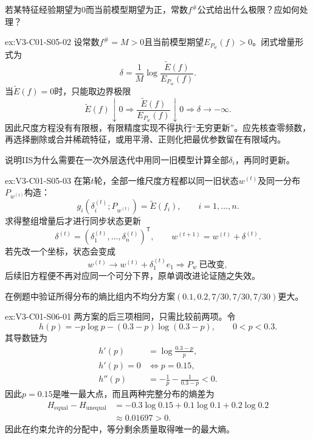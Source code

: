 \begin{SLChapterExercisePairSection}
\begin{exercise}\label{ex:V3-C01-S05-02}
若某特征经验期望为0而当前模型期望为正，常数$f^\#$公式给出什么极限？应如何处理？
\end{exercise}
\ifSLFullEdition
{}\label{sol:V3-C01-S05-02}
\begin{chapterexercisesolution}{ex:V3-C01-S05-02}
设常数$f^\#=M>0$且当前模型期望$E_{P_w}(f)>0$。闭式增量形式为
\[
\delta=\frac1M\log\frac{\widetilde E(f)}{E_{P_w}(f)}.
\]
当$\widetilde E(f)=0$时，只能取边界极限
\[
\widetilde E(f)\downarrow0
\Longrightarrow
\frac{\widetilde E(f)}{E_{P_w}(f)}\downarrow0
\Longrightarrow
\delta\to-\infty.
\]
因此尺度方程没有有限根，有限精度实现不得执行“无穷更新”。应先核查零频数，再选择删除或合并稀疏特征，或用平滑、正则化把最优参数留在有限域内。
\end{chapterexercisesolution}
\fi

\begin{exercise}\label{ex:V3-C01-S05-03}
说明IIS为什么需要在一次外层迭代中用同一旧模型计算全部$\delta_i$，再同时更新。
\end{exercise}
\ifSLFullEdition
{}\label{sol:V3-C01-S05-03}
\begin{chapterexercisesolution}{ex:V3-C01-S05-03}
在第$t$轮，全部一维尺度方程都以同一旧状态$w^{(t)}$及同一分布$P_{w^{(t)}}$构造：
\[
g_i\!\left(\delta_i^{(t)};P_{w^{(t)}}\right)
=\widetilde E(f_i),
\qquad i=1,\ldots,n.
\]
求得整组增量后才进行同步状态更新
\[
\delta^{(t)}=(\delta_1^{(t)},\ldots,\delta_n^{(t)})^{\mathsf T},
\qquad
w^{(t+1)}=w^{(t)}+\delta^{(t)}.
\]
若先改一个坐标，状态会变成
\[
w^{(t)}\to w^{(t)}+\delta_1^{(t)}e_1
\Longrightarrow
P_w\ \text{已改变},
\]
后续旧方程便不再对应同一个可分下界，原单调改进论证随之失效。
\end{chapterexercisesolution}
\fi

\begin{exercise}\label{ex:V3-C01-S06-01}
在例题中验证所得分布的熵比组内不均分方案$(0.1,0.2,7/30,7/30,7/30)$更大。
\end{exercise}
\ifSLFullEdition
{}\label{sol:V3-C01-S06-01}
\begin{chapterexercisesolution}{ex:V3-C01-S06-01}
两方案的后三项相同，只需比较前两项。令
\[
h(p)=-p\log p-(0.3-p)\log(0.3-p),
\qquad 0<p<0.3.
\]
其导数链为
\[
\begin{aligned}
h'(p)&=\log\frac{0.3-p}{p},\\
h'(p)=0&\Longleftrightarrow p=0.15,\\
h''(p)&=-\frac1p-\frac1{0.3-p}<0.
\end{aligned}
\]
因此$p=0.15$是唯一最大点，而且两种完整分布的熵差为
\[
\begin{aligned}
H_{\mathrm{equal}}-H_{\mathrm{unequal}}
&=-0.3\log0.15+0.1\log0.1+0.2\log0.2\\
&\approx0.01697>0.
\end{aligned}
\]
因此在约束允许的分配中，等分剩余质量取得唯一的最大熵。
\end{chapterexercisesolution}
\fi


\end{SLChapterExercisePairSection}
